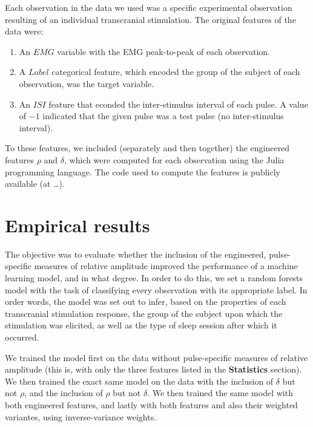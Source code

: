 \documentclass{article}
\begin{document}
\justifying
\begin{multicols}{2}

Each observation in the data we used was a specific experimental observation
resulting of an individual transcranial stimulation. The original features of the data
were: 

\begin{enumerate}
    \item An $EMG$ variable with the EMG peak-to-peak of each observation.
    \item A $Label$ categorical feature, which encoded the group of
        the subject of each observation, was the target variable. 
    \item An $ISI$ feature that econded the inter-stimulus interval of each
        pulse. A value of $-1$ indicated that the given pulse was a test pulse (no
        inter-stimulus interval).
\end{enumerate}

To these features, we included (separately and then together) the engineered
features $\rho$ and $\delta$, which were computed for each observation using the
Julia programming language. The code used to compute the features is publicly
available (at \ldots).

\section{Empirical results}

The objective was to evaluate whether the inclusion of the engineered,
pulse-specific measures of relative amplitude improved the performance of a
machine learning model, and in what degree. In order to do this, we set a
random forests model with the task of classifying every observation with its
appropriate label. In order words, the model was set out to infer, based on the
properties of each transcranial stimulation response, the group of the subject
upon which the stimulation was elicited, as well as the type of sleep session
after which it occurred.

We trained the model first on the data without pulse-specific
measures of relative amplitude (this is, with only the three features listed in
the \textbf{Statistics} section). We then trained the exact same model on the
data with the inclusion of $\delta$ but not $\rho$, and the inclusion of $\rho$
but not $\delta$. We then trained the same model with both engineered features,
and lastly with both features and also their weighted variantes, using
inverse-variance weights.



\end{multicols}
\end{document}
